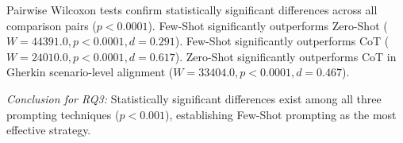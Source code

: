 Pairwise Wilcoxon tests confirm statistically significant differences across all comparison pairs ($p < 0.0001$). Few-Shot significantly outperforms Zero-Shot ($W = 44391.0, p < 0.0001, d = 0.291$). Few-Shot significantly outperforms CoT ($W = 24010.0, p < 0.0001, d = 0.617$). Zero-Shot significantly outperforms CoT in Gherkin scenario-level alignment ($W = 33404.0, p < 0.0001, d = 0.467$).

\textit{Conclusion for RQ3:} Statistically significant differences exist among all three prompting techniques ($p < 0.001$), establishing Few-Shot prompting as the most effective strategy.
